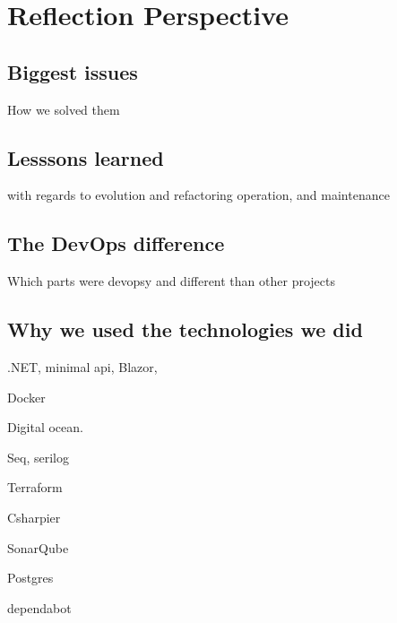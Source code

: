 \section{Reflection Perspective}

\subsection{Biggest issues}

How we solved them

\subsection{Lesssons learned}

with regards to
evolution and refactoring
operation, and
maintenance

\subsection{The DevOps difference}

Which parts were devopsy and different than other projects

\subsection{Why we used the technologies we did}

.NET, minimal api, Blazor,

Docker

Digital ocean.

Seq, serilog

Terraform

Csharpier

SonarQube

Postgres

dependabot